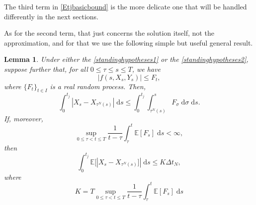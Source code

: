 \documentclass[reqno,12pt]{amsart}
\theoremstyle{plain}%
\newtheorem{lem}{Lemma}[section]
\theoremstyle{definition}
\begin{document}
The third term in \eqref{Etjbasicbound} is the more delicate one that will be handled differently in the next sections.

As for the second term, that just concerns the solution itself, not the approximation, and for that we use the following simple but useful general result.

\begin{lem}
    \label{estimatesecondterminglobalerror}
    Under either the \cref{standinghypotheses1} or the \cref{standinghypotheses2}, suppose further that, for all $0 \leq \tau \leq s \leq T$, we have
    \begin{equation}
        \label{Ftcondition}
      |f(s, X_s, Y_s)| \leq F_t,
    \end{equation}
    where $\{F_t\}_{t\in I}$ is a real random process. Then,
    \begin{equation}
        \label{estimatesecondterminglobalerrorintegral}
        \int_0^{t_j} |X_s - X_{\tau^N(s)}| \;\mathrm{d}s \leq \int_0^{t_j} \int_{\tau^N(s)}^s F_\sigma \;\mathrm{d}\sigma \;\mathrm{d}s.
    \end{equation}
    If, moreover,
    \begin{equation}
        \label{averageFtestimate}
        \sup_{0 \leq \tau < t \leq T}\frac{1}{t - \tau}\int_\tau^t \mathbb{E}[F_s]\;\mathrm{d}s < \infty,
    \end{equation}
    then
    \begin{equation}
        \label{expectedestimatesecondterminglobalerrorintegral}
        \int_0^{t_j} \mathbb{E}[|X_s - X_{\tau^N(s)}]| \;\mathrm{d}s \leq K \Delta t_N,
    \end{equation}
    where
    \begin{equation}
      \label{Kconstantinestimatesecondterminglobalerror}
        K = T\sup_{0 \leq \tau < t \leq T}\frac{1}{t - \tau}\int_\tau^t \mathbb{E}[F_s]\;\mathrm{d}s
    \end{equation}
\end{lem}
\end{document}
